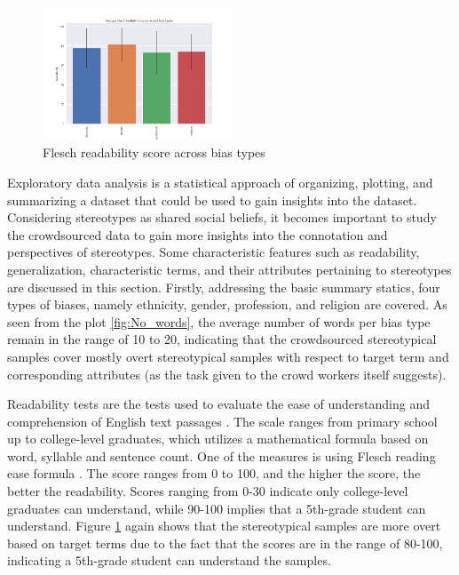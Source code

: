 \begin{figure}[h]
    \centering
    \includegraphics[width=0.5\textwidth]{thesis/figures/flesch_score.png}
    \caption{Flesch readability score across bias types}
    \label{fig:Flesch_scores}
\end{figure}
Exploratory data analysis is a statistical approach of organizing, plotting, and summarizing a dataset that could be used to gain insights into the dataset. Considering stereotypes as shared social beliefs, it becomes important to study the crowdsourced data to gain more insights into the connotation and perspectives of stereotypes. Some characteristic features such as readability, generalization, characteristic terms, and their attributes pertaining to stereotypes are discussed in this section.
Firstly, addressing the basic summary statics, four types of biases, namely ethnicity, gender, profession, and religion are covered. As seen from the plot \ref{fig:No_words}, the average number of words per bias type remain in the range of 10 to 20, indicating that the crowdsourced stereotypical samples cover mostly overt stereotypical samples with respect to target term and corresponding attributes (as the task given to the crowd workers itself suggests). 



Readability tests are the tests used to evaluate the ease of understanding and comprehension of English text passages \cite{barnett1979readability}. The scale ranges from primary school up to college-level graduates, which utilizes a mathematical formula based on word, syllable and sentence count.  One of the measures is using Flesch reading ease formula \cite{flesch1948new}. The score ranges from 0 to 100, and the higher the score, the better the readability. Scores ranging from 0-30 indicate only college-level graduates can understand, while 90-100 implies that a 5th-grade student can understand. Figure \ref{fig:Flesch_scores} again shows that the stereotypical samples are more overt based on target terms due to the fact that the scores are in the range of 80-100, indicating a 5th-grade student can understand the samples.

